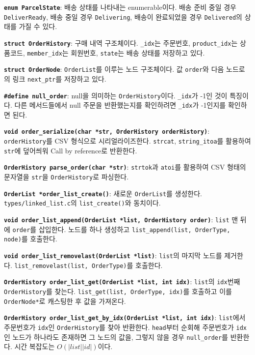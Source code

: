 \documentclass[runningheads]{llncs}
\begin{document}
\textbf{\texttt{enum ParcelState}}: 배송 상태를 나타내는 enumerable이다. 배송 준비 중일 경우 \texttt{DeliverReady}, 배송 중일 경우 \texttt{Delivering}, 배송이 완료되었을 경우 \texttt{Delivered}의 상태를 가질 수 있다.

\textbf{\texttt{struct OrderHistory}}: 구매 내역 구조체이다. \texttt{_idx}는 주문번호, \texttt{product_idx}는 상품코드, \texttt{member_idx}는 회원번호, \texttt{state}는 배송 상태를 저장하고 있다.

\textbf{\texttt{struct OrderNode}}: \texttt{OrderList}를 이루는 노드 구조체이다. 값 \texttt{order}와 다음 노드로의 링크 \texttt{next_ptr}를 저장하고 있다.

\textbf{\texttt{\#define null_order}}: null을 의미하는 \texttt{OrderHistory}이다. \texttt{_idx}가 -1인 것이 특징이다. 다른 메서드들에서 null 주문을 반환했는지를 확인하려면 \texttt{_idx}가 -1인지를 확인하면 된다.

\textbf{\texttt{void order_serialize(char *str, OrderHistory orderHistory)}}: \texttt{orderHistory}를 CSV 형식으로 시리얼라이즈한다. \texttt{strcat}, \texttt{string_itoa}를 활용하여 \texttt{str}에 덮어씌워 Call by reference로 반환한다.

\textbf{\texttt{OrderHistory parse_order(char *str)}}: \texttt{strtok}과 \texttt{atoi}를 활용하여 CSV 형태의 문자열을 \texttt{str}을 \texttt{OrderHistory}로 파싱한다. 

\textbf{\texttt{OrderList *order_list_create()}}: 새로운 \texttt{OrderList}를 생성한다. \texttt{types/linked_list.c}의 \texttt{list_create()}와 동치이다.

\textbf{\texttt{void order_list_append(OrderList *list, OrderHistory order)}}: \texttt{list} 맨 뒤에 \texttt{order}를 삽입한다. 노드를 하나 생성하고 \texttt{list_append(list, OrderType, node)}를 호출한다.

\textbf{\texttt{void order_list_removelast(OrderList *list)}}: \texttt{list}의 마지막 노드를 제거한다. \texttt{list_removelast(list, OrderType)}를 호출한다.

\textbf{\texttt{OrderHistory order_list_get(OrderList *list, int idx)}}: \texttt{list}의 \texttt{idx}번째 \texttt{OrderHistory}를 찾는다. \texttt{list_get(list, OrderType, idx)}를 호출하고 이를 \texttt{OrderNode*}로 캐스팅한 후 값을 가져온다.

\textbf{\texttt{OrderHistory order_list_get_by_idx(OrderList *list, int idx)}}: \texttt{list}에서 주문번호가 \texttt{idx}인 \texttt{OrderHistory}를 찾아 반환한다. \texttt{head}부터 순회해 주문번호가 \texttt{idx}인 노드가 하나라도 존재하면 그 노드의 값을, 그렇지 않을 경우 \texttt{null_order}를 반환한다. 시간 복잡도는 $O(\left|list\right|\left|id\right|)$이다.
\end{document}
